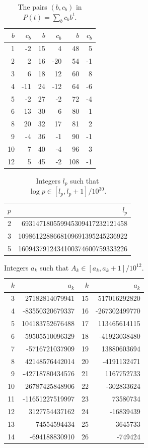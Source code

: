 \begin{table}[htbp]
\centering
\small
\caption{The pairs $(b,c_b)$ in $P(t)=\sum_b c_b b^t$.}\label{tab:terms}
\begin{tabular}{rr@{\qquad}rr@{\qquad}rr}
\toprule
$b$ & $c_b$ & $b$ & $c_b$ & $b$ & $c_b$ \\
\midrule
1 & -2 & 15 & 4 & 48 & 5 \\
2 & 2 & 16 & -20 & 54 & -1 \\
3 & 6 & 18 & 12 & 60 & 8 \\
4 & -11 & 24 & -12 & 64 & -6 \\
5 & -2 & 27 & -2 & 72 & -4 \\
6 & -13 & 30 & -6 & 80 & -1 \\
8 & 20 & 32 & 17 & 81 & 2 \\
9 & -4 & 36 & -1 & 90 & -1 \\
10 & 7 & 40 & -4 & 96 & 3 \\
12 & 5 & 45 & -2 & 108 & -1 \\
\bottomrule
\end{tabular}
\end{table}

\begin{table}[htbp]
\centering
\small
\caption{Integers $l_p$ such that $\log p\in[l_p,l_p+1]/10^{30}$.}\label{tab:logs}
\begin{tabular}{rr}
\toprule
$p$ & $l_p$ \\
\midrule
2 & 693147180559945309417232121458 \\
3 & 1098612288668109691395245236922 \\
5 & 1609437912434100374600759333226 \\
\bottomrule
\end{tabular}
\end{table}

\begin{table}[htbp]
\centering
\small
\caption{Integers $a_k$ such that $A_k\in[a_k,a_k+1]/10^{12}$.}\label{tab:A}
\begin{tabular}{rr@{\qquad}rr}
\toprule
$k$ & $a_k$ & $k$ & $a_k$ \\
\midrule
3 & 27182814079941 & 15 & 517016292820 \\
4 & -83550320679337 & 16 & -267302499770 \\
5 & 104183752676488 & 17 & 113465614115 \\
6 & -59505510096329 & 18 & -41923038480 \\
7 & -5716721037909 & 19 & 13880603694 \\
8 & 42148576442014 & 20 & -4191132471 \\
9 & -42718780434576 & 21 & 1167752733 \\
10 & 26787425848906 & 22 & -302833624 \\
11 & -11651227519997 & 23 & 73580734 \\
12 & 3127754437162 & 24 & -16839439 \\
13 & 74554594434 & 25 & 3645733 \\
14 & -694188830910 & 26 & -749424 \\
\bottomrule
\end{tabular}
\end{table}

